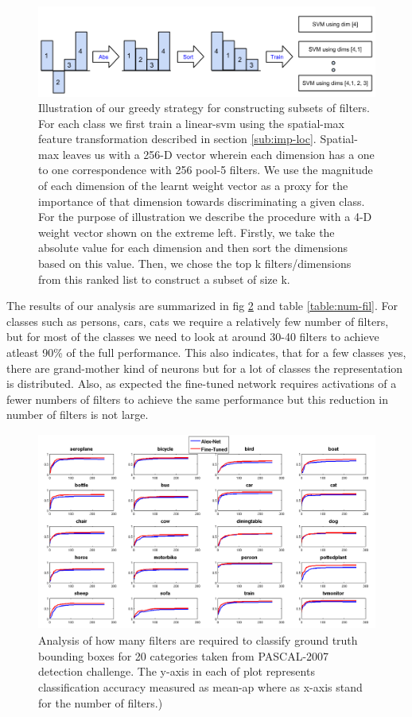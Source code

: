 \documentclass[runningheads]{llncs}
\begin{document}
\begin{figure}[H]
\centering
\includegraphics[scale=0.30]{images/how-many.png}
\caption{Illustration of our greedy strategy for constructing subsets of filters. For each class we first train a linear-svm using the spatial-max feature transformation described in section \ref{sub:imp-loc}. Spatial-max leaves us with a 256-D vector wherein each dimension has a one to one correspondence with 256 pool-5 filters. We use the magnitude of each dimension of the learnt weight vector as a proxy for the importance of that dimension towards discriminating a given class. For the purpose of illustration we describe the procedure with a 4-D weight vector shown on the extreme left. Firstly, we take the absolute value for each dimension and then sort the dimensions based on this value. Then, we chose the top k filters/dimensions from this ranked list to construct a subset of size k.}
\label{fig:sel-strategy}
\end{figure}

The results of our analysis are summarized in fig \ref{fig:svm-sel-dims} and table \ref{table:num-fil}. For classes such as persons, cars, cats we require a relatively few number of filters, but for most of the classes we need to look at around 30-40 filters to achieve atleast 90\% of the full performance. This also indicates, that for a few classes yes, there are grand-mother kind of neurons but for a lot of classes the representation is distributed. Also, as expected the fine-tuned network requires activations of a fewer numbers of filters to achieve the same performance but this reduction in number of filters is not large. 

\begin{figure}[H]
\centering
\includegraphics[height=6.5cm]{images/svm_seldims.png}
\caption{Analysis of how many filters are required to classify ground truth bounding boxes for 20 categories taken from PASCAL-2007 detection challenge. The y-axis in each of plot represents classification accuracy measured as mean-ap where as x-axis stand for the number of filters.)}
\label{fig:svm-sel-dims}
\end{figure}
\end{document}
